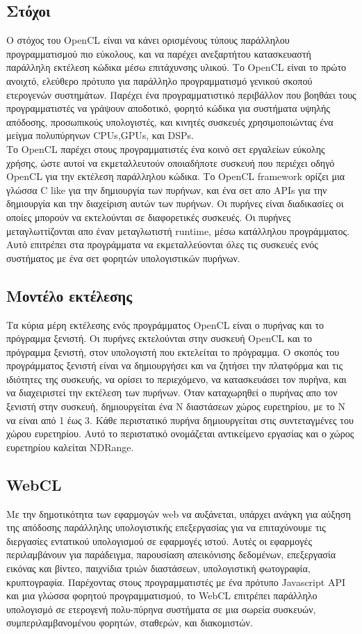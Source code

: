\subsection{Στόχοι}
Ο στόχος του OpenCL είναι να κάνει ορισμένους τύπους παράλληλου προγραμματισμού πιο εύκολους, και να παρέχει ανεξαρτήτου κατασκευαστή παράλληλη εκτέλεση κώδικα μέσω επιτάχυνσης υλικού. Το OpenCL είναι το πρώτο ανοιχτό, ελεύθερο πρότυπο για παράλληλο προγραμματισμό γενικού σκοπού ετερογενών συστημάτων. Παρέχει ένα προγραμματιστικό περιβάλλον που βοηθάει τους προγραμματιστές να γράψουν αποδοτικό, φορητό κώδικα για συστήματα υψηλής απόδοσης, προσωπικούς υπολογιστές, και κινητές συσκευές χρησιμοποιώντας ένα μείγμα πολυπύρηνων CPUs,GPUs, και DSPs.\\
Το OpenCL παρέχει στους προγραμματιστές ένα κοινό σετ εργαλείων εύκολης χρήσης\cite{opencl-3}, ώστε αυτοί να εκμεταλλευτούν οποιαδήποτε συσκευή που περιέχει οδηγό OpenCL για την εκτέλεση παράλληλου κώδικα. Το OpenCL framework ορίζει μια γλώσσα C like για την δημιουργία των πυρήνων, και ένα σετ απο APIs για την δημιουργία και την διαχείριση αυτών των πυρήνων. Οι πυρήνες είναι διαδικασίες οι οποίες μπορούν να εκτελούνται σε διαφορετικές συσκευές. Οι πυρήνες μεταγλωττίζονται απο έναν μεταγλωτιστή runtime, μέσω κατάλληλου προγράμματος. Αυτό επιτρέπει στα προγράμματα να εκμεταλλεύονται όλες τις συσκευές ενός συστήματος με ένα σετ φορητών υπολογιστικών πυρήνων.
\subsection{Μοντέλο εκτέλεσης}
Τα κύρια μέρη εκτέλεσης ενός προγράμματος OpenCL είναι ο πυρήνας και το πρόγραμμα ξενιστή. Οι πυρήνες εκτελούνται στην συσκευή OpenCL και το πρόγραμμα ξενιστή, στον υπολογιστή που εκτελείται το πρόγραμμα. Ο σκοπός του προγράμματος ξενιστή είναι να δημιουργήσει και να ζητήσει την πλατφόρμα και τις ιδιότητες της συσκευής, να ορίσει το περιεχόμενο, να κατασκευάσει τον πυρήνα, και να διαχειριστεί την εκτέλεση των πυρήνων. Όταν καταχωρηθεί ο πυρήνας απο τον ξενιστή στην συσκευή, δημιουργείται ένα Ν διαστάσεων χώρος ευρετηρίου, με το Ν να είναι από 1 έως 3. Κάθε περιστατικό πυρήνα δημιουργείται στις συντεταγμένες του χώρου ευρετηρίου. Αυτό το περιστατικό ονομάζεται αντικείμενο εργασίας και ο χώρος ευρετηρίου καλείται NDRange.\cite{opencl-4}  

\subsection{WebCL}
Με την δημοτικότητα των εφαρμογών web να αυξάνεται, υπάρχει ανάγκη για αύξηση της απόδοσης παράλληλης υπολογιστικής επεξεργασίας για να επιταχύνουμε τις διεργασίες εντατικού υπολογισμού σε εφαρμογές ιστού. Αυτές οι εφαρμογές περιλαμβάνουν για παράδειγμα, παρουσίαση απεικόνισης δεδομένων, επεξεργασία εικόνας και βίντεο, παιχνίδια τριών διαστάσεων, υπολογιστική φωτογραφία, κρυπτογραφία. Παρέχοντας στους προγραμματιστές με ένα πρότυπο Javascript API και μια γλώσσα φορητού προγραμματισμού, το WebCL επιτρέπει παράλληλο υπολογισμό σε ετερογενή πολυ-πύρηνα συστήματα σε μια σωρεία συσκευών, συμπεριλαμβανομένου φορητών, σταθερών, και διακομιστών. 

